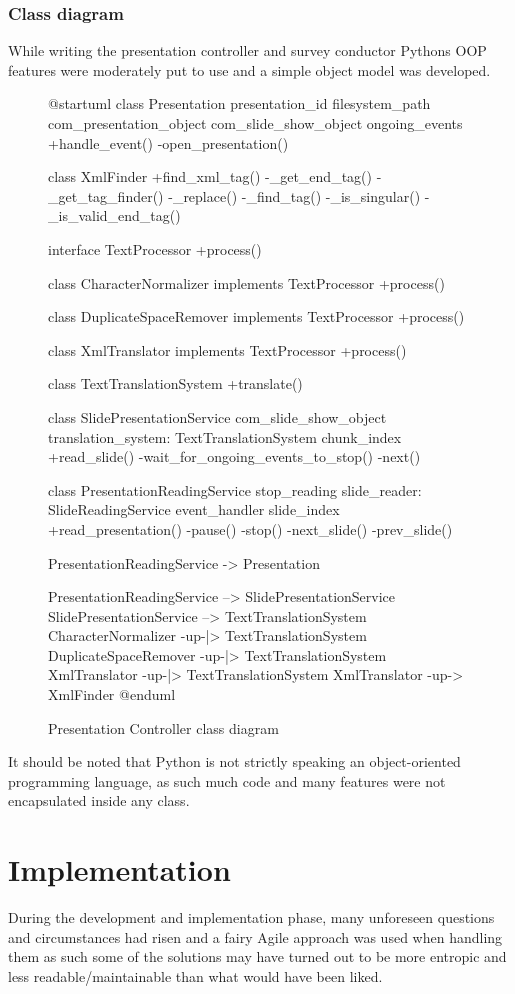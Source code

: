 \documentclass[12pt, fleqn, a4paper]{article}
\begin{document}
\subsubsection{Class diagram}
While writing the presentation controller and survey conductor Pythons OOP features were moderately put to use and a simple object model was developed.
\begin{figure}[H]
	\centering
	\begin{plantuml}
@startuml
class Presentation {
	presentation_id
	filesystem_path
	com_presentation_object
	com_slide_show_object
	ongoing_events
	+handle_event()
	-open_presentation()
}

class XmlFinder {
	+find_xml_tag()
	-_get_end_tag()
	-_get_tag_finder()
	-_replace()
	-_find_tag()
	-_is_singular()
	-_is_valid_end_tag()
}

interface TextProcessor {
	+process()
}

class CharacterNormalizer implements TextProcessor {
	+process()
}

class DuplicateSpaceRemover implements TextProcessor {
	+process()
}

class XmlTranslator implements TextProcessor {
	+process() 
}


class TextTranslationSystem {
	+translate()
}

class SlidePresentationService {
	com_slide_show_object
	translation_system: TextTranslationSystem
	chunk_index
	+read_slide()
	-wait_for_ongoing_events_to_stop()
	-next()
}

class PresentationReadingService {
	stop_reading
	slide_reader: SlideReadingService
	event_handler
	slide_index
	+read_presentation()
	-pause()
	-stop()
	-next_slide()
	-prev_slide()
}

PresentationReadingService -> Presentation

PresentationReadingService --> SlidePresentationService
SlidePresentationService --> TextTranslationSystem
CharacterNormalizer -up-|> TextTranslationSystem
DuplicateSpaceRemover -up-|> TextTranslationSystem
XmlTranslator -up-|> TextTranslationSystem
XmlTranslator -up-> XmlFinder
@enduml
	\end{plantuml}
	\caption{Presentation Controller class diagram}
\end{figure}
It should be noted that Python is not strictly speaking an object-oriented programming language, as such much code and many features were not encapsulated inside any class.
\section{Implementation} %
During the development and implementation phase, many unforeseen questions and circumstances had risen and a fairy Agile approach was used when handling them as such some of the solutions may have turned out to be more entropic and less readable/maintainable than what would have been liked.
\end{document}
